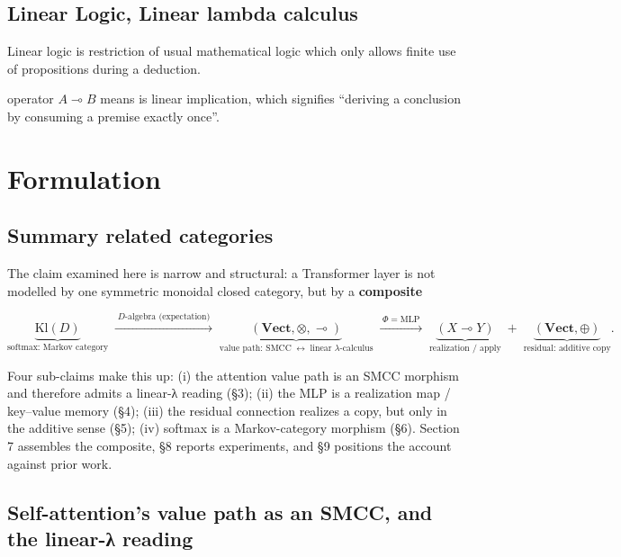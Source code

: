 \documentclass[a4paper,11pt]{article}
\begin{document}
\hypertarget{linear-logic-linear-lambda-calculus}{%
\subsection{Linear Logic, Linear lambda calculus}\label{linear-logic-linear-lambda-calculus}}

Linear logic is restriction of usual mathematical logic which only allows finite use of propositions during a deduction.

operator \(A \multimap B\) means is linear implication, which signifies ``deriving a conclusion by consuming a premise exactly once''.

\hypertarget{formulation}{%
\section{Formulation}\label{formulation}}

\hypertarget{summary-related-categories}{%
\subsection{Summary related categories}\label{summary-related-categories}}

The claim examined here is narrow and structural: a Transformer layer is not modelled by one symmetric monoidal closed category, but by a \textbf{composite}

\[
\underbrace{\mathrm{Kl}(D)}_{\text{softmax: Markov category}}
\;\xrightarrow{\;D\text{-algebra (expectation)}\;}\;
\underbrace{(\mathbf{Vect},\otimes,\multimap)}_{\text{value path: SMCC} \;\leftrightarrow\; \text{linear }\lambda\text{-calculus}}
\;\xrightarrow{\;\Phi=\text{MLP}\;}\;
\underbrace{(X\multimap Y)}_{\text{realization / apply}}
\;+\;
\underbrace{(\mathbf{Vect},\oplus)}_{\text{residual: additive copy}} .
\]

Four sub-claims make this up: (i) the attention value path is an SMCC
morphism and therefore admits a linear-λ reading (§3); (ii) the MLP is a
realization map / key--value memory (§4); (iii) the residual connection
realizes a copy, but only in the additive sense (§5); (iv) softmax is a
Markov-category morphism (§6). Section 7 assembles the composite, §8
reports experiments, and §9 positions the account against prior work.

\hypertarget{self-attentions-value-path-as-an-smcc-and-the-linear-ux3bb-reading}{%
\subsection{Self-attention's value path as an SMCC, and the linear-λ
reading}\label{self-attentions-value-path-as-an-smcc-and-the-linear-ux3bb-reading}}
\end{document}
